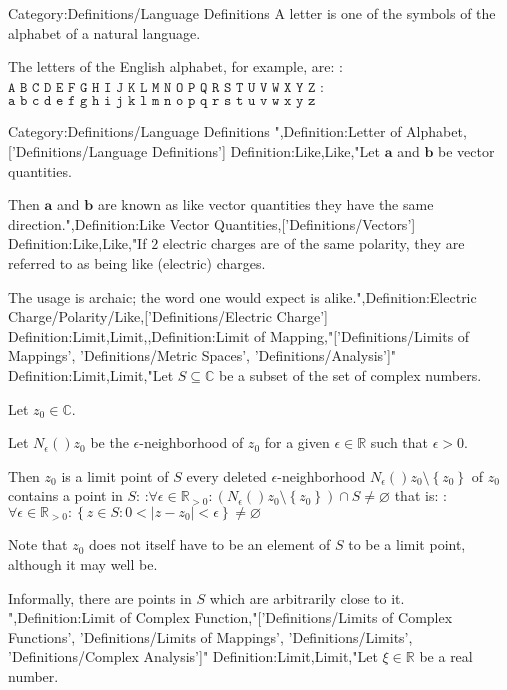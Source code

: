 Category:Definitions/Language Definitions
A letter is one of the symbols of the alphabet of a natural language.

The letters of the English alphabet, for example, are:
:$\texttt {A B C D E F G H I J K L M N O P Q R S T U V W X Y Z}$
:$\texttt {a b c d e f g h i j k l m n o p q r s t u v w x y z}$


Category:Definitions/Language Definitions
",Definition:Letter of Alphabet,['Definitions/Language Definitions']
Definition:Like,Like,"Let $\mathbf a$ and $\mathbf b$ be vector quantities.

Then $\mathbf a$ and $\mathbf b$ are known as like vector quantities  they have the same direction.",Definition:Like Vector Quantities,['Definitions/Vectors']
Definition:Like,Like,"If $2$ electric charges are of the same polarity, they are referred to as being like (electric) charges.


The usage is archaic; the word one would expect is alike.",Definition:Electric Charge/Polarity/Like,['Definitions/Electric Charge']
Definition:Limit,Limit,,Definition:Limit of Mapping,"['Definitions/Limits of Mappings', 'Definitions/Metric Spaces', 'Definitions/Analysis']"
Definition:Limit,Limit,"Let $S \subseteq \mathbb C$ be a subset of the set of complex numbers.

Let $z_0 \in \mathbb C$. 

Let $N_\epsilon \left(   \right){z_0}$ be the $\epsilon$-neighborhood of $z_0$ for a given $\epsilon \in \mathbb R$ such that $\epsilon > 0$.


Then $z_0$ is a limit point of $S$  every deleted $\epsilon$-neighborhood $N_\epsilon \left(   \right){z_0} \setminus \left\lbrace z_0 \right\rbrace$ of $z_0$ contains a point in $S$:
:$\forall \epsilon \in \mathbb R_{>0}: \left( N_\epsilon \left(   \right){z_0} \setminus \left\lbrace z_0 \right\rbrace  \right) \cap S \ne \varnothing$
that is:
:$\forall \epsilon \in \mathbb R_{>0}: \left\lbrace z \in S: 0 < \left\lvert z - z_0 \right\rvert < \epsilon \right\rbrace \ne \varnothing$


Note that $z_0$ does not itself have to be an element of $S$ to be a limit point, although it may well be.

Informally, there are points in $S$ which are arbitrarily close to it.
",Definition:Limit of Complex Function,"['Definitions/Limits of Complex Functions', 'Definitions/Limits of Mappings', 'Definitions/Limits', 'Definitions/Complex Analysis']"
Definition:Limit,Limit,"Let $\xi \in \mathbb R$ be a real number.

